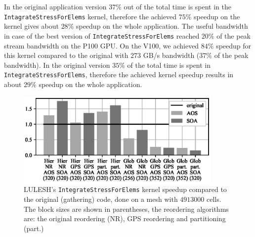 In the original application version $37\%$ out of the total time is spent in 
the \texttt{IntagrateStressForElems} kernel, therefore the achieved $75\%$ 
speedup on the kernel gives about $28\%$ speedup on the whole application. The
useful bandwidth in case of the best version of \texttt{IntegrateStressForElems}
reached $20\%$ of the peak stream bandwidth on the P100 GPU. On the V100, 
we achieved $84\%$ speedup for this kernel compared to the
original with $273$ GB/s bandwidth ($37\%$ of the peak bandwidth). In the
original version $35\%$ of the total time is spent in 
\texttt{IntegrateStressForElems}, therefore the achieved kernel speedup 
results in about $29\%$ speedup on the whole application.

\begin{figure}[Htbp]
\centering
\includegraphics[width=10cm]{fig/lulesh_speedup.eps}
\caption{LULESH's \texttt{IntegrateStressForElems} kernel speedup compared to 
the original (gathering) code, done on a mesh with $4913000$ cells. The block
sizes are shown in parentheses, the reordering algorithms are: the original
reordering (NR), GPS reordering and partitioning 
(part.)} \label{fig:lulesh_speedup}
\end{figure}

